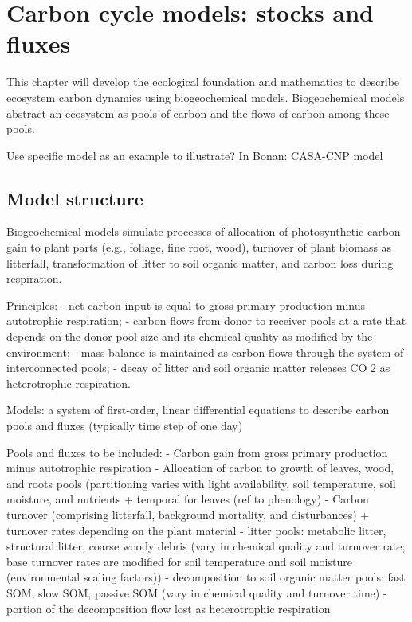 \documentclass[oneside]{book}
\begin{document}
\section{Carbon cycle models: stocks and
fluxes}\label{carbon-cycle-models-stocks-and-fluxes}

This chapter will develop the ecological foundation and mathematics to
describe ecosystem carbon dynamics using biogeochemical models.
Biogeochemical models abstract an ecosystem as pools of carbon and the
flows of carbon among these pools.

Use specific model as an example to illustrate? In Bonan: CASA-CNP model

\subsection{Model structure}\label{model-structure}

Biogeochemical models simulate processes of allocation of photosynthetic
carbon gain to plant parts (e.g., foliage, fine root, wood), turnover of
plant biomass as litterfall, transformation of litter to soil organic
matter, and carbon loss during respiration.

Principles: - net carbon input is equal to gross primary production
minus autotrophic respiration; - carbon flows from donor to receiver
pools at a rate that depends on the donor pool size and its chemical
quality as modified by the environment; - mass balance is maintained as
carbon flows through the system of interconnected pools; - decay of
litter and soil organic matter releases CO 2 as heterotrophic
respiration.

Models: a system of first-order, linear differential equations to
describe carbon pools and fluxes (typically time step of one day)

Pools and fluxes to be included: - Carbon gain from gross primary
production minus autotrophic respiration - Allocation of carbon to
growth of leaves, wood, and roots pools (partitioning varies with light
availability, soil temperature, soil moisture, and nutrients + temporal
for leaves (ref to phenology) - Carbon turnover (comprising litterfall,
background mortality, and disturbances) + turnover rates depending on
the plant material - litter pools: metabolic litter, structural litter,
coarse woody debris (vary in chemical quality and turnover rate; base
turnover rates are modified for soil temperature and soil moisture
(environmental scaling factors)) - decomposition to soil organic matter
pools: fast SOM, slow SOM, passive SOM (vary in chemical quality and
turnover time) - portion of the decomposition flow lost as heterotrophic
respiration
\end{document}
